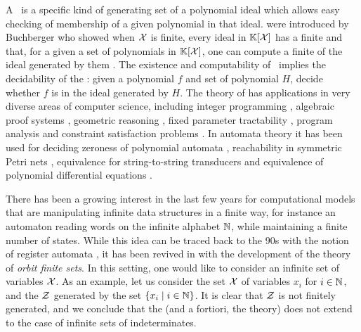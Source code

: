 \AP A \Grb\ is a specific kind of generating set of a polynomial ideal
which allows easy checking of membership of a given polynomial in that ideal.
 were introduced by Buchberger who showed when $\mathcal{X}$ is
finite, every ideal in $\mathbb{K}[\mathcal{X}]$ has a finite  and
that, for a given a set of polynomials in $\mathbb{K}[\mathcal{X}]$, one can compute a
finite  of the ideal generated by them \cite{BUCH76}. The
existence and computability of \Grbs\ implies the decidability of the
: given a polynomial $f$ and set of polynomial
$H$, decide whether $f$ is in the ideal generated by $H$. The theory of
 has applications in very diverse areas of computer
science, including integer programming \cite{Sturmfels96}, algebraic proof
systems \cite{algProof}, geometric reasoning \cite{Cox2015chGeom}, fixed
parameter tractability \cite{ACDM22}, program analysis \cite{SSM04} and
constraint satisfaction problems \cite{Mas21}.
In automata theory it has been used for deciding zeroness of polynomial
automata \cite{BEDUSHWO17}, reachability in symmetric Petri nets \cite{MAME82},
equivalence for string-to-string transducers \cite{HONKALA00} and equivalence
of polynomial differential equations \cite{CLEMENTE24}. 

\AP There has been a growing interest in the last few years for computational
models that are manipulating infinite data structures in a finite way, for
instance an automaton reading words on the infinite alphabet $\mathbb{N}$, while
maintaining a finite number of states. While this idea can be traced back to
the 90s with the notion of register automata \cite{KAFR94}, it has been revived
in with the development of the theory of \emph{orbit finite sets}. In this
setting, one would like to consider an infinite set of variables $\mathcal{X}$. As an
example, let us consider the set $\mathcal{X}$ of variables $x_i$ for $i \in \mathbb{N}$, and
the  $\mathcal{Z}$ generated by the set $\{ x_i \mid i \in \mathbb{N} \}$. It is
clear that $\mathcal{Z}$ is not finitely generated, and we conclude that the
 (and a fortiori, the 
theory) does not extend to the case of infinite sets of indeterminates.

